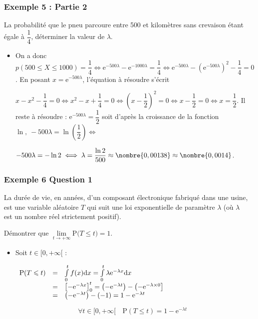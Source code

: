 \documentclass[xcolor=svgnames,t,final]{beamer}
\newcommand{\proba}[1]{\text{P}\big(#1\big)}
\begin{document}
\begin{frame}

\frametitle{Exemple 5 : Partie 2}

La probabilité que le pneu parcoure entre 500 et  kilomètres sans crevaison étant égale à $\dfrac{1}{4}$, déterminer la valeur de $\lambda$.

\begin{itemize}

\pause \item 
On a donc $p(500 \leqslant X \leqslant 1000) = \dfrac{1}{4} \iff \text{e}^{-500\lambda} - \text{e}^{-1000\lambda} = \dfrac{1}{4} \iff \text{e}^{-500\lambda} - \left(\text{e}^{-500\lambda} \right)^2 - \dfrac{1}{4} = 0$.
En posant $x = \text{e}^{-500\lambda}$, l'équation à résoudre s'écrit 

$x - x^2 - \dfrac{1}{4} = 0 \iff x^2 - x + \dfrac{1}{4} = 0 \iff \left(x - \dfrac{1}{2} \right)^2  = 0 \iff x - \dfrac{1}{2} = 0 \iff x = \dfrac{1}{2}$.
Il reste à résoudre :
$\text{e}^{-500\lambda} = \dfrac{1}{2}$ soit d'après la croissance de la fonction $\ln,\: -500\lambda = \ln \left(\dfrac{1}{2}\right) \iff $

$-500\lambda = - \ln 2 \iff \lambda = \dfrac{\ln 2}{500}\approx \nombre{0,00138} \approx \nombre{0,0014}$.

\end{itemize}



\end{frame}


\begin{frame}


\frametitle{Exemple 6 Question 1}
\label{exemple6}


La durée de vie, en années, d'un composant électronique fabriqué dans une usine, est une variable aléatoire $T$ qui suit une loi exponentielle de paramètre $\lambda$ (où $\lambda$ est un nombre réel strictement positif).

Démontrer que $\lim\limits_{t \to + \infty} \proba{T \leqslant t}=1$.

\begin{itemize}
\item Soit $t\in[0,+\infty[$ :

$\begin{array}[t]{lcl}
\text{P}(T\leqslant t)&=&\int\limits_{0}^{t}f(x)\text{d}x=\int\limits_{0}^{t}\lambda \text{e}^{-\lambda x}\text{d}x\\
&=&\left[ -\text{e}^{-\lambda x}\right]_{0}^{t}=\left( -\text{e}^{-\lambda t}\right)-\left( -\text{e}^{-\lambda \times 0}\right]\\ 
&=&\left( -\text{e}^{-\lambda t}\right)-(-1) =1-\text{e}^{-\lambda t}   
\end{array}$	

	
\[ \forall t\in[0,+\infty[\quad \text{P}(T\leqslant t)=1-\text{e}^{-\lambda t}\]

\end{itemize}


\end{frame}
\end{document}
